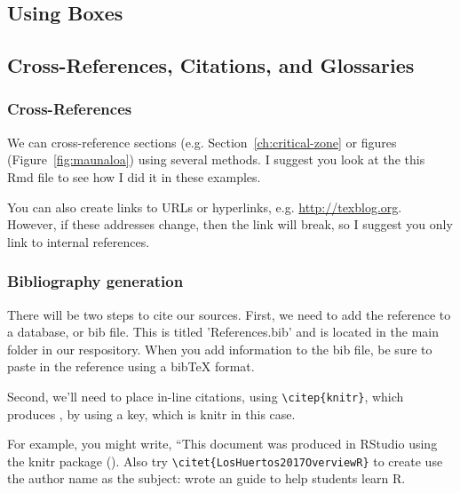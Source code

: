 \documentclass{book}\usepackage{knitr}
\begin{document}
\subsection{Using Boxes}


\subsection{ Cross-References, Citations, and Glossaries}

\subsubsection{Cross-References}

We can cross-reference sections (e.g. Section~\ref{ch:critical-zone}  or figures (Figure~\ref{fig:maunaloa}) using several methods. I suggest you look at the this Rmd file to see how I did it in these examples.

You can also create links to URLs or hyperlinks, e.g. \url{http://texblog.org}. However, if these addresses change, then the link will break, so I suggest you only link to internal references.

\subsubsection{Bibliography generation}

There will be two steps to cite our sources. First, we need to add the reference to a database, or bib file. This is titled 'References.bib' and is located in the main folder in our respository. When you add information to the bib file, be sure to paste in the reference using a bibTeX format. 

Second, we'll need to place in-line citations, using \verb"\citep{knitr}", which produces \citep{knitr}, by using a key, which is knitr in this case. 

For example, you might write, ``This document was produced in RStudio using the knitr package (\citep{knitr}). Also try \verb"\citet{LosHuertos2017OverviewR}" to create use the author name as the subject: \citet{LosHuertos2017OverviewR} wrote an guide to help students learn R. 
\end{document}
